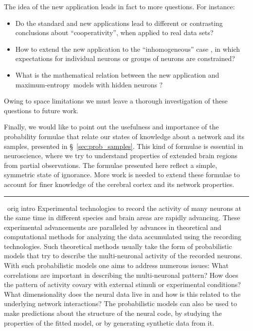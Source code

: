 \documentclass[\ifafour a4paper,12pt,\else a5paper,10pt,\fi%
onecolumn,oneside,article,%
british%
]{memoir}
\theoremstyle{remark}
\theoremstyle{innote}
\newcommand*{\citep}{\parencites}
\renewcommand*{\|}{\nonscript\,\vert\nonscript\;\mathopen{}}
\newcommand*{\sect}{\S}%
\newcommand*{\cf}{{cf.}}
\newcommand*{\puzzle}{{\fontencoding{U}\fontfamily{fontawesometwo}\selectfont\symbol{225}}}
\newcommand{\mynote}[1]{ {\color{notecolour}\puzzle\ #1}}
\newcommand*{\me}{maximum-entropy}
\begin{document}
The idea of the new application leads in fact to more questions. For
instance:
\begin{itemize}
\item Do the standard and new applications lead to different or contrasting
  conclusions about \enquote{cooperativity}, when applied to real data
  sets?
\item How to extend the new application to the \enquote{inhomogeneous} case
  \citep{schneidmanetal2006,shlensetal2006,roudietal2009b}, in which
  expectations for individual neurons or groups of neurons are constrained?
\item What is the mathematical relation between the new application and
  \me\ models with hidden neurons
  \citep{smolensky1986,kulkarnietal2007,huang2015,dunnetal2017}?
\end{itemize}
Owing to space limitations we must leave a thorough investigation of these
questions to future work.

Finally, we would like to point out the usefulness and importance of the
probability formulae that relate our states of knowledge about a network
and its samples, presented in \sect~\ref{sec:prob_samples}. This kind of
formulae is essential in neuroscience, where we try to understand
properties of extended brain regions from partial observations. The
formulae presented here reflect a simple, symmetric state of ignorance.
More work is needed \citep[\cf][]{levinaetal2017} to extend these formulae
to account for finer knowledge of the cerebral cortex and its network
properties.


\clearpage

\hrule
{}\label{orig_intro}
\mynote{orig intro}
Experimental technologies to record the activity of many neurons at the
same time in different species and brain areas are rapidly advancing. These
experimental advancements are paralleled by advances in theoretical and
computational methods for analyzing the data accumulated using the
recording technologies. Such theoretical methods usually take the form of
probabilistic models that try to describe the multi-neuronal activity of
the recorded neurons. With such probabilistic models one aims to address
numerous issues: What correlations are important in describing the
multi-neuronal pattern? How does the pattern of activity covary with
external stimuli or experimental conditions? What dimensionality does the
neural data live in and how is this related to the underlying network
interactions? The probabilistic models can also be used to make predictions
about the structure of the neural code, by studying the properties of the
fitted model, or by generating synthetic data from it.
\end{document}
